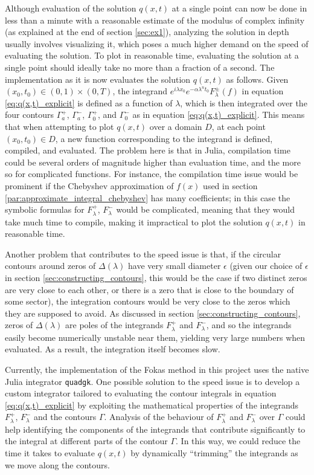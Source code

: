 \documentclass[12pt, oneside, a4paper]{article}
\begin{document}
Although evaluation of the solution $q(x,t)$ at a single point can now be done in less than a minute with a reasonable estimate of the modulus of complex infinity (as explained at the end of section \ref{sec:ex1}), analyzing the solution in depth usually involves visualizing it, which poses a much higher demand on the speed of evaluating the solution. To plot in reasonable time, evaluating the solution at a single point should ideally take no more than a fraction of a second. The implementation as it is now evaluates the solution $q(x,t)$ as follows. Given $(x_0, t_0)\in (0,1)\times (0,T)$, the integrand $e^{i\lambda x_0}e^{-\alpha \lambda^n t_0}F_\lambda^\pm(f)$ in equation \eqref{eq:q(x,t)_explicit} is defined as a function of $\lambda$, which is then integrated over the four contours $\Gamma_a^+$, $\Gamma_a^-$, $\Gamma_0^+$, and $\Gamma_0^-$ as in equation \eqref{eq:q(x,t)_explicit}. This means that when attempting to plot $q(x,t)$ over a domain $D$, at each point $(x_0, t_0)\in D$, a new function corresponding to the integrand is defined, compiled, and evaluated. The problem here is that in Julia, compilation time could be several orders of magnitude higher than evaluation time, and the more so for complicated functions. For instance, the compilation time issue would be prominent if the Chebyshev approximation of $f(x)$ used in section \ref{par:approximate_integral_chebyshev} has many coefficients; in this case the symbolic formulas for $F_\lambda^+$, $F_\lambda^-$ would be complicated, meaning that they would take much time to compile, making it impractical to plot the solution $q(x,t)$ in reasonable time.

Another problem that contributes to the speed issue is that, if the circular contours around zeros of $\Delta(\lambda)$ have very small diameter $\epsilon$ (given our choice of $\epsilon$ in section \ref{sec:constructing_contours}, this would be the case if two distinct zeros are very close to each other, or there is a zero that is close to the boundary of some sector), the integration contours would be very close to the zeros which they are supposed to avoid. As discussed in section \ref{sec:constructing_contours}, zeros of $\Delta(\lambda)$ are poles of the integrands $F^+_\lambda$ and $F^-_\lambda$, and so the integrands easily become numerically unstable near them, yielding very large numbers when evaluated. As a result, the integration itself becomes slow.

Currently, the implementation of the Fokas method in this project uses the native Julia integrator \texttt{quadgk}. One possible solution to the speed issue is to develop a custom integrator tailored to evaluating the contour integrals in equation \eqref{eq:q(x,t)_explicit} by exploiting the mathematical properties of the integrands $F^+_\lambda$, $F^-_\lambda$ and the contours $\Gamma$. Analysis of the behaviour of $F_\lambda^+$ and $F_\lambda^-$ over $\Gamma$ could help identifying the components of the integrands that contribute significantly to the integral at different parts of the contour $\Gamma$. In this way, we could reduce the time it takes to evaluate $q(x,t)$ by dynamically ``trimming'' the integrands as we move along the contours.

\newpage
{}

\newpage

% 

\end{document}
